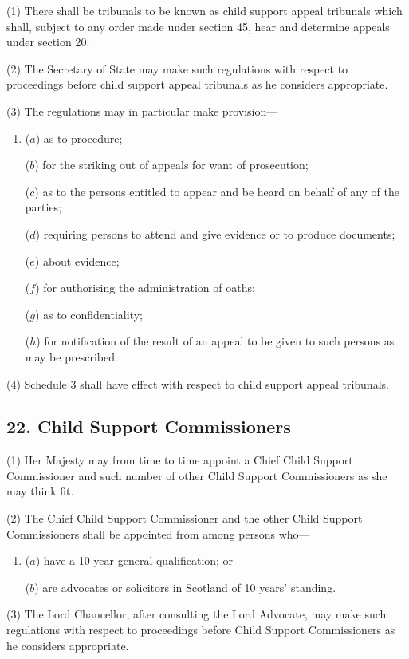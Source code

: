 \documentclass[12pt,a4paper]{article}
\begin{document}
(1) There shall be tribunals to be known as child support appeal tribunals which shall, subject to any order made under section 45, hear and determine appeals under section 20.

(2) The Secretary of State may make such regulations with respect to proceedings before child support appeal tribunals as he considers appropriate.

(3) The regulations may in particular make provision—
\begin{enumerate}\item[]
($a$) as to procedure;

($b$) for the striking out of appeals for want of prosecution;

($c$) as to the persons entitled to appear and be heard on behalf of any of the parties;

($d$) requiring persons to attend and give evidence or to produce documents;

($e$) about evidence;

($f$) for authorising the administration of oaths;

($g$) as to confidentiality;

($h$) for notification of the result of an appeal to be given to such persons as may be prescribed.
\end{enumerate}

(4) Schedule 3 shall have effect with respect to child support appeal tribunals.


\subsection{22. Child Support Commissioners}

(1) Her Majesty may from time to time appoint a Chief Child Support Commissioner and such number of other Child Support Commissioners as she may think fit.

(2) The Chief Child Support Commissioner and the other Child Support Commissioners shall be appointed from among persons who—
\begin{enumerate}\item[]
($a$) have a 10 year general qualification; or

($b$) are advocates or solicitors in Scotland of 10 years' standing.
\end{enumerate}

(3) The Lord Chancellor, after consulting the Lord Advocate, may make such regulations with respect to proceedings before Child Support Commissioners as he considers appropriate.
\end{document}
